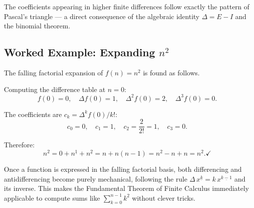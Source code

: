 \begin{remark*}[Interpretation]
The coefficients appearing in higher finite differences follow exactly
the pattern of Pascal's triangle --- a direct consequence of the
algebraic identity \(\Delta = E - I\) and the binomial theorem.
\end{remark*}

\subsection*{\texorpdfstring{Worked Example: Expanding \(n^2\)}{Worked Example: Expanding n squared}}

\begin{example*}
The falling factorial expansion of \(f(n) = n^2\) is found as follows.

Computing the difference table at \(n = 0\):
\[
f(0) = 0, \quad
\Delta f(0) = 1, \quad
\Delta^2 f(0) = 2, \quad
\Delta^3 f(0) = 0.
\]

The coefficients are \(c_k = \Delta^k f(0)/k!\):
\[
c_0 = 0, \quad c_1 = 1, \quad c_2 = \frac{2}{2!} = 1, \quad c_3 = 0.
\]

Therefore:
\[
n^2 = 0 + n^{\underline{1}} + n^{\underline{2}}
= n + n(n-1)
= n^2 - n + n
= n^2. \checkmark
\]
\end{example*}

\begin{remark*}[Interpretation]
Once a function is expressed in the falling factorial basis, both
differencing and antidifferencing become purely mechanical, following the
rule \(\Delta\,x^{\underline{k}} = k\,x^{\underline{k-1}}\) and its
inverse. This makes the Fundamental Theorem of Finite Calculus
immediately applicable to compute sums like \(\sum_{k=0}^{n-1} k^2\)
without clever tricks.
\end{remark*}
